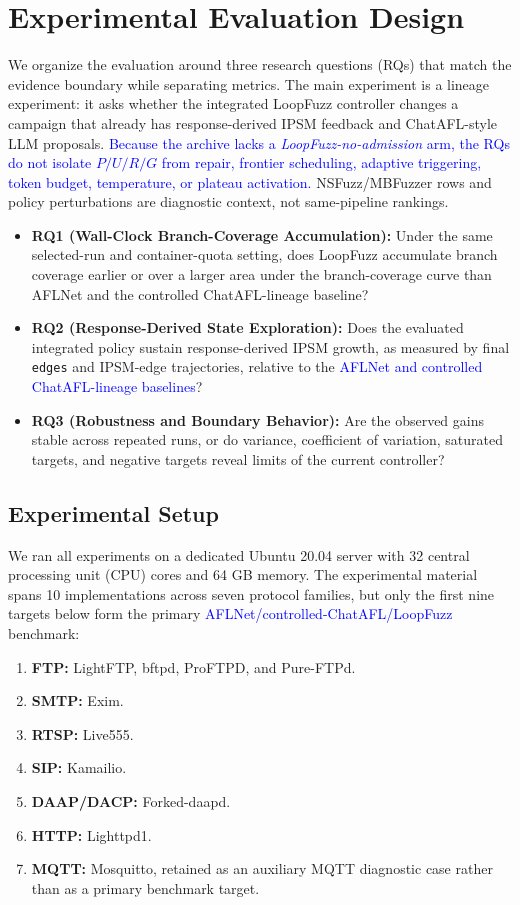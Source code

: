 \documentclass[final,5p,times,number]{elsarticle}
\begin{document}
\section{Experimental Evaluation Design}

We organize the evaluation around three research questions (RQs) that match the evidence boundary while separating metrics. The main experiment is a lineage experiment: it asks whether the integrated LoopFuzz controller changes a campaign that already has response-derived IPSM feedback and ChatAFL-style LLM proposals. \textcolor{blue}{Because the archive lacks a \emph{LoopFuzz-no-admission} arm, the RQs do not isolate $P/U/R/G$ from repair, frontier scheduling, adaptive triggering, token budget, temperature, or plateau activation.} NSFuzz/MBFuzzer rows and policy perturbations are diagnostic context, not same-pipeline rankings.
\begin{itemize}
    \item \textbf{RQ1 (Wall-Clock Branch-Coverage Accumulation):} Under the same selected-run and container-quota setting, does LoopFuzz accumulate branch coverage earlier or over a larger area under the branch-coverage curve than AFLNet and the controlled ChatAFL-lineage baseline?
    \item \textbf{RQ2 (Response-Derived State Exploration):} Does the evaluated integrated policy sustain response-derived IPSM growth, as measured by final \texttt{edges} and IPSM-edge trajectories, relative to the \textcolor{blue}{AFLNet and controlled ChatAFL-lineage baselines}?
    \item \textbf{RQ3 (Robustness and Boundary Behavior):} Are the observed gains stable across repeated runs, or do variance, coefficient of variation, saturated targets, and negative targets reveal limits of the current controller?
\end{itemize}

\subsection{Experimental Setup}
We ran all experiments on a dedicated Ubuntu 20.04 server with 32 central processing unit (CPU) cores and 64 GB memory. The experimental material spans 10 implementations across seven protocol families, but only the first nine targets below form the primary \textcolor{blue}{AFLNet/controlled-ChatAFL/LoopFuzz} benchmark:
\begin{enumerate}
    \item \textbf{FTP:} LightFTP, bftpd, ProFTPD, and Pure-FTPd.
    \item \textbf{SMTP:} Exim.
    \item \textbf{RTSP:} Live555.
    \item \textbf{SIP:} Kamailio.
    \item \textbf{DAAP/DACP:} Forked-daapd.
    \item \textbf{HTTP:} Lighttpd1.
    \item \textbf{MQTT:} Mosquitto, retained as an auxiliary MQTT diagnostic case rather than as a primary benchmark target.
\end{enumerate}
\end{document}
